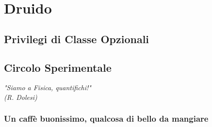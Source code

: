 \chapter{Druido}

\section{Privilegi di Classe Opzionali}

\section{Circolo Sperimentale}

\begin{DndReadAloud}
  \it
  "Siamo a Fisica, quantifichi!" \\ (R. Dolesi)
\end{DndReadAloud}

\subsection{Un caffè buonissimo, qualcosa di bello da mangiare}
